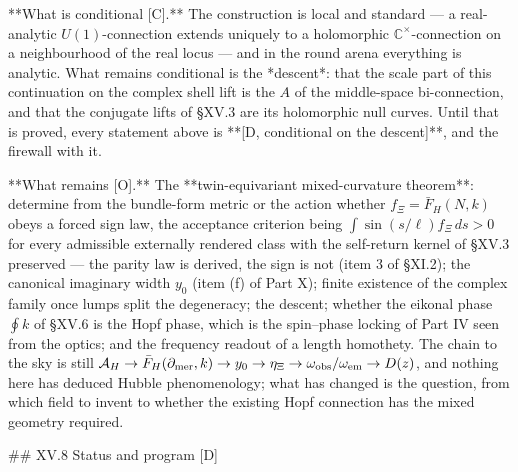**What is conditional [C].** The construction is local and standard — a real-analytic $U(1)$-connection extends uniquely to a holomorphic $\mathbb C^\times$-connection on a neighbourhood of the real locus — and in the round arena everything is analytic. What remains conditional is the *descent*: that the scale part of this continuation on the complex shell lift is the $A$ of the middle-space bi-connection, and that the conjugate lifts of §XV.3 are its holomorphic null curves. Until that is proved, every statement above is **[D, conditional on the descent]**, and the firewall with it.

**What remains [O].** The **twin-equivariant mixed-curvature theorem**: determine from the bundle-form metric or the action whether $f_\Xi = \bar F_H(N,k)$ obeys a forced sign law, the acceptance criterion being $\int\sin(s/\ell)f_\Xi\,ds>0$ for every admissible externally rendered class with the self-return kernel of §XV.3 preserved — the parity law is derived, the sign is not (item 3 of §XI.2); the canonical imaginary width $y_0$ (item (f) of Part X); finite existence of the complex family once lumps split the degeneracy; the descent; whether the eikonal phase $\oint k$ of §XV.6 is the Hopf phase, which is the spin–phase locking of Part IV seen from the optics; and the frequency readout of a length homothety. The chain to the sky is still $\mathcal A_H\to\bar F_H(\partial_{\rm mer},k)\to y_0\to\eta_\Xi\to\omega_{\rm obs}/\omega_{\rm em}\to D(z)$, and nothing here has deduced Hubble phenomenology; what has changed is the question, from which field to invent to whether the existing Hopf connection has the mixed geometry required.

## XV.8 Status and program [D]

